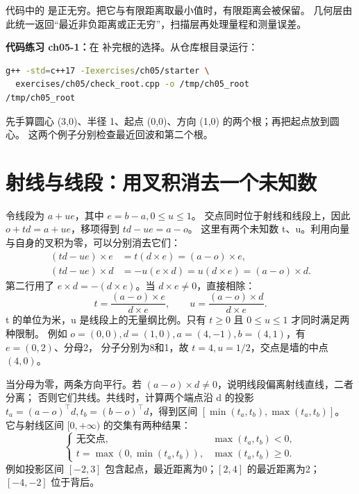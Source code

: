代码中的  是正无穷。把它与有限距离取最小值时，有限距离会被保留。
几何层由此统一返回“最近非负距离或正无穷”，扫描层再处理量程和测量误差。

\textbf{代码练习 ch05-1：}在 
补完根的选择。从仓库根目录运行：
\begin{lstlisting}[language=bash,numbers=none]
g++ -std=c++17 -Iexercises/ch05/starter \
  exercises/ch05/check_root.cpp -o /tmp/ch05_root
/tmp/ch05_root
\end{lstlisting}
先手算圆心 (3,0)、半径 1、起点 (0,0)、方向 (1,0) 的两个根；再把起点放到圆心。
这两个例子分别检查最近回波和第二个根。

\section{射线与线段：用叉积消去一个未知数}
令线段为 $a+ue$，其中 $e=b-a,0\leq u\leq1$。
交点同时位于射线和线段上，因此 $o+td=a+ue$，移项得到 $td-ue=a-o$。
这里有两个未知数 t、u。利用向量与自身的叉积为零，可以分别消去它们：
\begin{align}
(td-ue)\times e&=t(d\times e)=(a-o)\times e,\\
(td-ue)\times d&=-u(e\times d)=u(d\times e)=(a-o)\times d.
\end{align}
第二行用了 $e\times d=-(d\times e)$。当 $d\times e\ne0$，直接相除：
\begin{equation}
t=\frac{(a-o)\times e}{d\times e},\qquad
u=\frac{(a-o)\times d}{d\times e}.
\end{equation}
t 的单位为米，u 是线段上的无量纲比例。只有 $t\geq0$ 且 $0\leq u\leq1$ 才同时满足两种限制。
例如 $o=(0,0),d=(1,0),a=(4,-1),b=(4,1)$，有 $e=(0,2)$、分母2，
分子分别为8和1，故 $t=4,u=1/2$，交点是墙的中点 $(4,0)$。

当分母为零，两条方向平行。若 $(a-o)\times d\ne0$，说明线段偏离射线直线，二者分离；
否则它们共线。共线时，计算两个端点沿 d 的投影
$t_a=(a-o)^\top d,t_b=(b-o)^\top d$，得到区间 $[\min(t_a,t_b),\max(t_a,t_b)]$。
它与射线区间 $[0,+\infty)$ 的交集有两种结果：
\begin{equation}
\begin{cases}
\text{无交点},&\max(t_a,t_b)<0,\\
t=\max(0,\min(t_a,t_b)),&\max(t_a,t_b)\geq0.
\end{cases}
\end{equation}
例如投影区间 $[-2,3]$ 包含起点，最近距离为0；$[2,4]$ 的最近距离为2；$[-4,-2]$ 位于背后。

\par\noindent\begin{minipage}{\linewidth}

\end{minipage}\par

